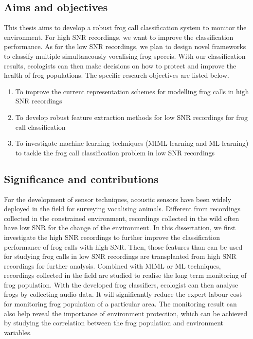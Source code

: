 \subsection{Aims and objectives}
This thesis aims to develop a robust frog call classification system to monitor the environment. For high SNR recordings, we want to improve the classification performance. As for the low SNR recordings, we plan to design novel frameworks to classify multiple simultaneously vocalising frog speceis. With our classification results, ecologists can then make decisions on how to protect and improve the health of frog populations. The specific research objectives are listed below.


\begin{enumerate}

\item	To improve the current representation schemes for modelling frog calls in high SNR recordings

\item 	To develop robust feature extraction methods for low SNR recordings for frog call classification

\item   To investigate machine learning techniques (MIML learning and ML learning) to tackle the frog call classification problem in low SNR recordings

\end{enumerate}
 
 
 
\subsection{Significance and contributions}
For the development of sensor techniques, acoustic sensors have been widely deployed in the field for surveying vocalising animals. Different from recordings collected in the constrained environment, recordings collected in the wild often have low SNR for the change of the environment. In this dissertation, we first investigate the high SNR recordings to further improve the classification performance of frog calls with high SNR. Then, those features than can be used for studying frog calls in low SNR recordings are transplanted from high SNR recordings for further analysis. Combined with MIML or ML techniques, recordings collected in the field are studied to realise the long term monitoring of frog population.
With the developed frog classifiers, ecologist can then analyse frogs by collecting audio data. It will significantly reduce the expert labour cost for monitoring frog population of a particular area. The monitoring result can also help reveal the importance of environment protection, which can be achieved by studying the correlation between the frog population and environment variables.

